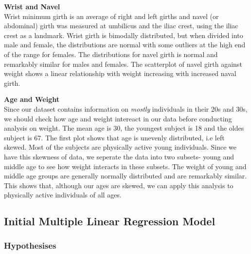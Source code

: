 \documentclass[11pt]{article}
\begin{document}

\newpage

\textbf{Wrist and Navel}\\ %
   
Wrist minimum girth is an average of right and left girths and navel (or abdominal) girth was measured at umbilicus and the iliac crest, using the iliac crest as a landmark. Wrist girth is bimodally distributed, but when divided into male and female, the distributions are normal with some outliers at the high end of the range for females. The distributions for navel girth is normal and remarkably similar for males and females. The scatterplot of navel girth against weight shows a linear relationship with weight increasing with increased naval girth.



\newpage

\textbf{Age and Weight}\\ %

Since our dataset contains information on \textit{mostly} individuals in their 20s and 30s, we should check how age and weight intereact in our data before conducting analysis on weight. The mean age is 30, the youngest subject is 18 and the oldes subject is 67. The first plot shows that age is unevenly distributed, i.e left skewed. Most of the subjects are physically active young individuals. Since we have this skewness of data, we seperate the data into two subsets- young and middle age to see how weight interacts in these subsets. The weight of young and middle age groups are generally normally distributed and are remarkably similar. This shows that, although our ages are skewed, we can apply this analysis to physically active individuals of all ages.




\subsection{Initial Multiple Linear Regression Model} 


\subsubsection{Hypothesises}%

\end{document}
